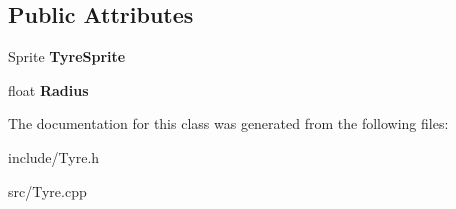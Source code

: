 \subsection*{Public Attributes}
\begin{DoxyCompactItemize}
\item 
\hypertarget{class_tyre_a068f6dcd12733c3df6d760053daf08ac}{}Sprite {\bfseries Tyre\+Sprite}\label{class_tyre_a068f6dcd12733c3df6d760053daf08ac}

\item 
\hypertarget{class_tyre_a1c0fd8531b72c94915867cb90dd175c9}{}float {\bfseries Radius}\label{class_tyre_a1c0fd8531b72c94915867cb90dd175c9}

\end{DoxyCompactItemize}


The documentation for this class was generated from the following files\+:\begin{DoxyCompactItemize}
\item 
include/Tyre.\+h\item 
src/Tyre.\+cpp\end{DoxyCompactItemize}
